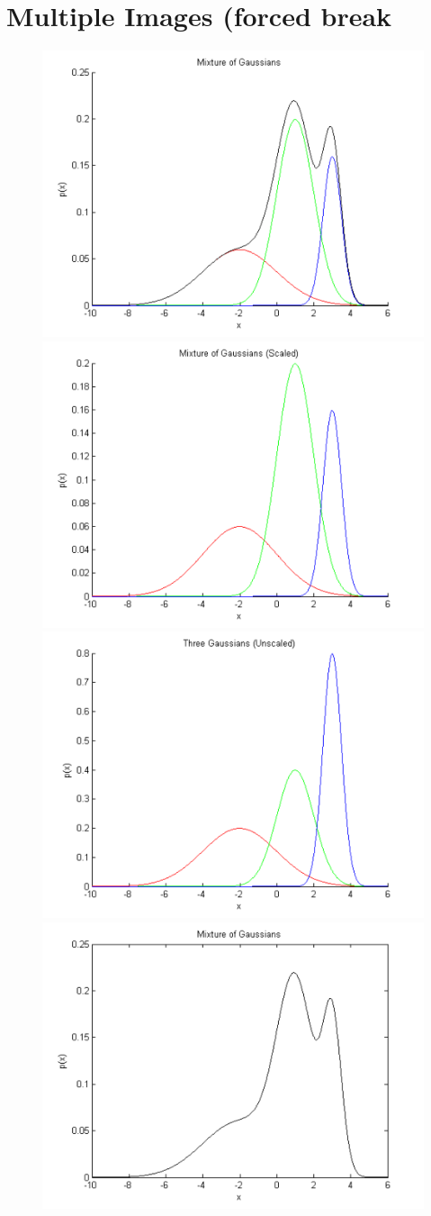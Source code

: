 \documentclass[10pt]{article}
\begin{document}
\section{Multiple Images (forced break}
\begin{figure}[H] %
	\centering
\includegraphics[width=0.4\linewidth]{Images/1}
\includegraphics[width=0.4\linewidth]{Images/2} \\ %
\includegraphics[width=0.4\linewidth]{Images/3}
\includegraphics[width=0.4\linewidth]{Images/4}
\end{figure}
\end{document}
